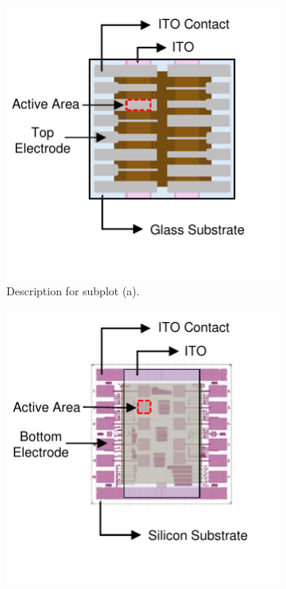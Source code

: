 \begin{figure}[htbp]
    \centering
    \begin{subfigure}[t]{0.49\textwidth} %
        \centering
        \includegraphics[width=\textwidth]{chapters/material_properties/images/Glass_Substrate.pdf} %
        \caption{Description for subplot (a).}
        \label{fig:ch2:glass_substrate}
    \end{subfigure}
    \hfill %
    \begin{subfigure}[t]{0.49\textwidth} %
        \centering
        \includegraphics[width=\textwidth]{chapters/material_properties/images/PIX_Substrate.pdf} %

\end{subfigure}
\end{figure}
